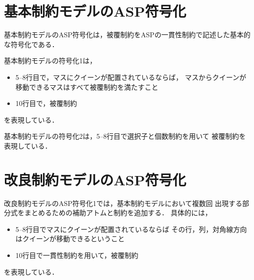 \section{基本制約モデルのASP符号化}
基本制約モデルのASP符号化は，被覆制約をASPの一貫性制約で記述した基本的な符号化である．




基本制約モデルの符号化1は，
\begin{itemize}
 \item 5--8行目で，マスにクイーンが配置されているならば，
  マスからクイーンが移動できるマスはすべて被覆制約を満たすこと
 \item 10行目で，被覆制約
\end{itemize}
を表現している．

基本制約モデルの符号化2は，5--8行目で選択子と個数制約を用いて
被覆制約を表現している．

\section{改良制約モデルのASP符号化}




改良制約モデルのASP符号化1では，基本制約モデルにおいて複数回
出現する部分式をまとめるための補助アトムと制約を追加する．
%
具体的には，
\begin{itemize}
  \item 5--8行目でマスにクイーンが配置されているならば
    その行，列，対角線方向はクイーンが移動できるということ
  \item 10行目で一貫性制約を用いて，被覆制約
\end{itemize}
を表現している．

